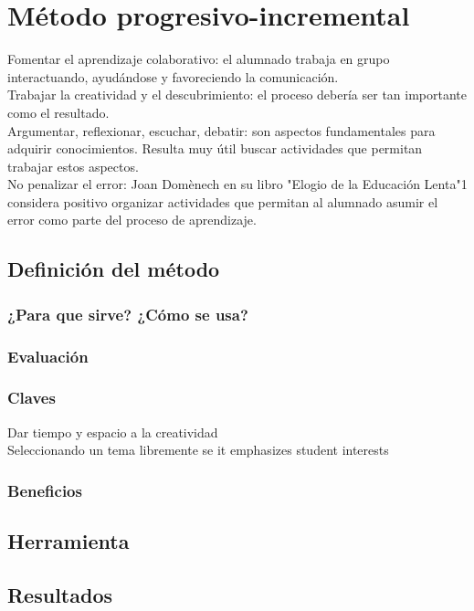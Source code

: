 \chapter{M\'etodo progresivo-incremental}
Fomentar el aprendizaje colaborativo: el alumnado trabaja en grupo interactuando, ayud\'andose y favoreciendo la comunicaci\'on.\\


Trabajar la creatividad y el descubrimiento: el proceso debería ser tan importante como el resultado.\\
Argumentar, reflexionar, escuchar, debatir: son aspectos fundamentales para adquirir conocimientos. Resulta muy útil buscar actividades que permitan 
trabajar estos aspectos.\\
No penalizar el error: Joan Domènech en su libro  "Elogio de la Educación Lenta"1 considera positivo organizar actividades que permitan al alumnado asumir 
el error como parte del proceso de aprendizaje.



\section{Definici\'on del m\'etodo}

\subsection{¿Para que sirve? ¿C\'omo se usa?}
\subsection{Evaluaci\'on}
\subsection{Claves}
Dar tiempo y espacio a la creatividad\\
Seleccionando un tema libremente se it emphasizes student interests

\subsection{Beneficios}

\section{Herramienta}\label{ch1:opts}

\section{Resultados}

